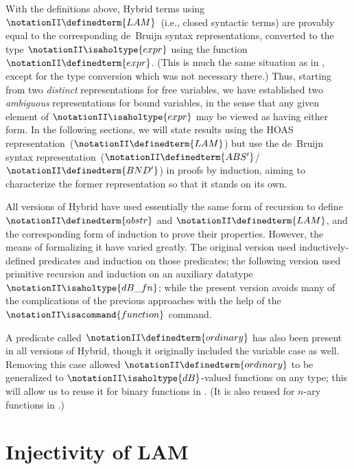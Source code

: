 \documentclass[copyright,creativecommons]{eptcs}
\begin{document}
With the definitions above, Hybrid terms using \(\notationII \definedterm{LAM}\)\ (i.e., closed
syntactic terms) are provably equal to the corresponding de~Bruijn syntax
representations, converted to the type \(\notationII \isaholtype{expr}\) using the function
\(\notationII \definedterm{expr}\).  (This is much the same situation as in
\cite{ambler/crole/momigliano:2002}, except for the type conversion
which was not necessary there.)  Thus, starting from two \emph{distinct}
representations for free variables, we have established two \emph{ambiguous}
representations for bound variables, in the sense that any given element
of \(\notationII \isaholtype{expr}\) may be viewed as having either form.
In the following sections, we will state results using
the HOAS representation~(\(\notationII \definedterm{LAM}\)) but use the de~Bruijn syntax
representation~(\(\notationII \definedterm{ABS'}\)/\(\notationII \definedterm{BND'}\)) in proofs by induction, aiming to
characterize the former representation so that it stands on its own.

All versions of Hybrid have used essentially the same form of recursion to
define \(\notationII \definedterm{abstr}\) and \(\notationII \definedterm{LAM}\), and the corresponding form of induction
to prove their properties.  However, the means of formalizing it have varied
greatly.  The original version \cite{ambler/crole/momigliano:2002} used
inductively-defined predicates and induction on those predicates; the
following version \cite{momigliano/martin/felty:2008}
used primitive recursion and induction on an auxiliary datatype \(\notationII \isaholtype{dB\_fn}\);
while the present version avoids many of the complications of the previous
approaches with the help of the \(\notationII \isacommand{function}\) command.

A predicate called \(\notationII \definedterm{ordinary}\) has also been present in all versions of
Hybrid, though it originally included the variable case as well.
Removing this case allowed \(\notationII \definedterm{ordinary}\) to be generalized to \(\notationII \isaholtype{dB}\)-valued
functions on any type; this will allow us to reuse it for binary functions in
.  (It is also reused for $n$-ary
functions in \cite[Sect.~3.3]{martin:2010a}.)


\section{Injectivity of \ldquo LAM\rdquo}
\label{sec:hybrid-defn-LAM-inject}
\end{document}

